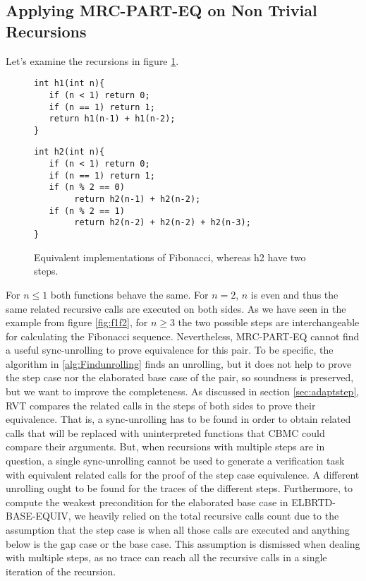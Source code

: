 \subsection{Applying MRC-PART-EQ on Non Trivial Recursions}
Let's examine the recursions in figure \ref{fig:f1f2cond}.
\begin{figure}[h]
\begin{center}
\begin{minipage}{7 cm}
\begin{lstlisting}
int h1(int n){
   if (n < 1) return 0;
   if (n == 1) return 1; 
   return h1(n-1) + h1(n-2);
}
\end{lstlisting}
\end{minipage}
\begin{minipage}{7 cm}
\begin{lstlisting}
int h2(int n){
   if (n < 1) return 0;
   if (n == 1) return 1; 
   if (n % 2 == 0)
        return h2(n-1) + h2(n-2);
   if (n % 2 == 1)
        return h2(n-2) + h2(n-2) + h2(n-3);
}
\end{lstlisting}
\end{minipage}
\caption{Equivalent implementations of Fibonacci, whereas h2 have two steps.}
\label{fig:f1f2cond}
\end{center}
\end{figure}
For $n\leq 1$ both functions behave the same. For $n=2$, $n$ is even and thus the same related recursive calls are executed on both sides. As we have seen in the example from figure \ref{fig:f1f2}, for $n\geq3$ the two possible steps are interchangeable for calculating the Fibonacci sequence. Nevertheless, MRC-PART-EQ cannot find a useful sync-unrolling to prove equivalence for this pair. To be specific, the algorithm in \ref{alg:Findunrolling} finds an unrolling, but it does not help to prove the step case nor the elaborated base case of the pair, so soundness is preserved, but we want to improve the completeness. As discussed in section \ref{sec:adaptstep}, RVT compares the related calls in the steps of both sides to prove their equivalence. That is, a sync-unrolling has to be found in order to obtain related calls that will be replaced with uninterpreted functions that CBMC could compare their arguments. But, when recursions with multiple steps are in question, a single sync-unrolling cannot be used to generate a verification task with equivalent related calls for the proof of the step case equivalence. A different unrolling ought to be found for the traces of the different steps. Furthermore, to compute the weakest precondition for the elaborated base case in ELBRTD-BASE-EQUIV, we heavily relied on the total recursive calls count due to the assumption that the step case is when all those calls are executed and anything below is the gap case or the base case. This assumption is dismissed when dealing with multiple steps, as no trace can reach all the recursive calls in a single iteration of the recursion.

